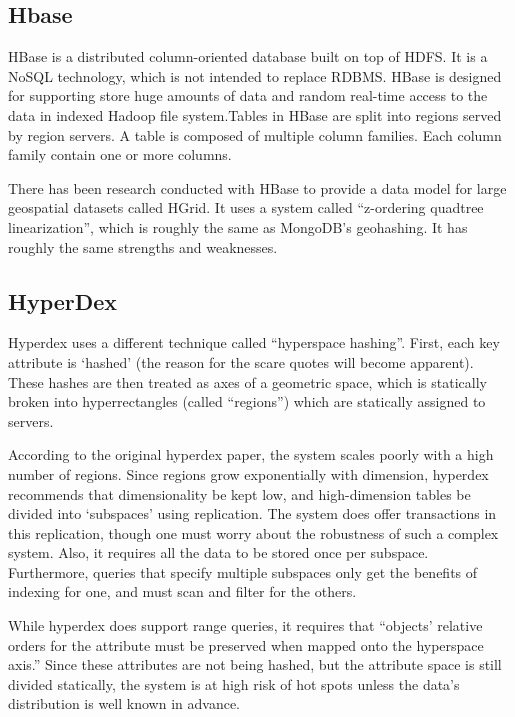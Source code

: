 \documentclass[11pt]{article}
\begin{document}
\subsection{Hbase}

HBase is a distributed column-oriented database built on top of HDFS. It is a NoSQL technology, which is not intended to replace RDBMS. HBase is designed for supporting store huge amounts of data and random real-time access to the data in indexed Hadoop file system.Tables in HBase are split into regions served by region servers. A table is composed of multiple column families. Each column family contain one or more columns. 

There has been research conducted with HBase to provide a data model for large geospatial datasets called HGrid. It uses a system called ``z-ordering quadtree linearization'', which is roughly the same as MongoDB's geohashing.  It has roughly the same strengths and weaknesses.

\subsection{HyperDex}

Hyperdex uses a different technique called ``hyperspace hashing''. First, each key attribute is `hashed' (the reason for the scare quotes will become apparent). These hashes are then treated as axes of a geometric space, which is statically broken into hyperrectangles (called ``regions'') which are statically assigned to servers.

According to the original hyperdex paper, the system scales poorly with a high number of regions. Since regions grow exponentially with dimension, hyperdex recommends that dimensionality be kept low, and high-dimension tables be divided into `subspaces' using replication. The system does offer transactions in this replication, though one must worry about the robustness of such a complex system. Also, it requires all the data to be stored once per subspace. Furthermore, queries that specify multiple subspaces only get the benefits of indexing for one, and must scan and filter for the others.

While hyperdex does support range queries, it requires that ``objects' relative orders for the attribute must be preserved when mapped onto the hyperspace axis.'' Since these attributes are not being hashed, but the attribute space is still divided statically, the system is at high risk of hot spots unless the data's distribution is well known in advance.
\end{document}
